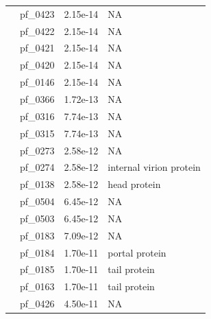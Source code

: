 \begin{table}
\begin{lrbox}{\rightbox}
\begin{tabular}[t]{llll}
                                        & pf\_0423 & 2.15e-14 & NA \\ 
                                        & pf\_0422 & 2.15e-14 & NA \\ 
                                        & pf\_0421 & 2.15e-14 & NA \\ 
                                        & pf\_0420 & 2.15e-14 & NA \\ 
                                        & pf\_0146 & 2.15e-14 & NA \\ 
                                        & pf\_0366 & 1.72e-13 & NA \\ 
                                        & pf\_0316 & 7.74e-13 & NA \\ 
                                        & pf\_0315 & 7.74e-13 & NA \\ 
                                        & pf\_0273 & 2.58e-12 & NA \\ 
                                        & pf\_0274 & 2.58e-12 & internal virion protein \\ 
                                        & pf\_0138 & 2.58e-12 & head protein \\ 
                                        & pf\_0504 & 6.45e-12 & NA \\ 
                                        & pf\_0503 & 6.45e-12 & NA \\ 
                                        & pf\_0183 & 7.09e-12 & NA \\ 
                                        & pf\_0184 & 1.70e-11 & portal protein \\ 
                                        & pf\_0185 & 1.70e-11 & tail protein \\ 
                                        & pf\_0163 & 1.70e-11 & tail protein \\ 
                                        & pf\_0426 & 4.50e-11 & NA \\ 
            \bottomrule
            \end{tabular}
    \end{lrbox}


    \centering
    \makebox[0pt]{%
        \hspace*{\fill}
        \begin{minipage}[t]{\wd\leftbox}
        \usebox{\leftbox}
        \end{minipage}\hfill
        \begin{minipage}[t]{\wd\rightbox}
        \usebox{\rightbox}
        \end{minipage}
        \hspace*{\fill}
        }
    \label{phage:table:cluster_functions}
\end{table}



